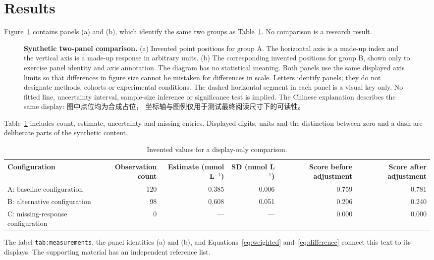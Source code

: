 \section{Results}\label{sec:results}
Figure~\ref{fig:panels} contains panels (a) and (b), which identify the same
two groups as Table~\ref{tab:measurements}. No comparison is a research result.

\begin{figure}[htbp]
\centering
\resizebox{146mm}{!}{}
\caption{\textbf{Synthetic two-panel comparison.}
(a) Invented point positions for group A. The horizontal axis is a made-up
index and the vertical axis is a made-up response in arbitrary units.
(b) The corresponding invented positions for group B, shown only to exercise
panel identity and axis annotation. The diagram has no statistical meaning.
Both panels use the same displayed axis limits so that differences in figure
size cannot be mistaken for differences in scale. Letters identify panels;
they do not designate methods, cohorts or experimental conditions. The dashed
horizontal segment in each panel is a visual key only. No fitted line,
uncertainty interval, sample-size inference or significance test is implied.
The Chinese explanation describes the same display: 图中点位均为合成占位，
坐标轴与图例仅用于测试最终阅读尺寸下的可读性。}
\label{fig:panels}
\end{figure}

Table~\ref{tab:measurements} includes count, estimate, uncertainty and missing
entries. Displayed digits, units and the distinction between zero and a dash
are deliberate parts of the synthetic content.
\begin{table}[htbp]
\centering
\caption{Invented values for a display-only comparison.}
\label{tab:measurements}
\syntheticTableStyle
\begin{tabularx}{\linewidth}{@{}>{\raggedright\arraybackslash}X
 r r r r r@{}}
\toprule
Configuration & Observation count & Estimate (mmol L$^{-1}$) & SD (mmol L$^{-1}$)
  & Score before adjustment & Score after adjustment\\
\midrule
A: baseline configuration & 120 & 0.385 & 0.006 & 0.759 & 0.781\\
B: alternative configuration & 98 & 0.608 & 0.051 & 0.206 & 0.240\\
C: missing-response configuration & 0 & --- & --- & 0.000 & 0.000\\
\bottomrule
\end{tabularx}
\end{table}

The label \texttt{tab:measurements}, the panel identities (a) and (b), and
Equations~\eqref{eq:weighted} and~\eqref{eq:difference} connect this text to its
displays. The supporting material has an independent reference list.
